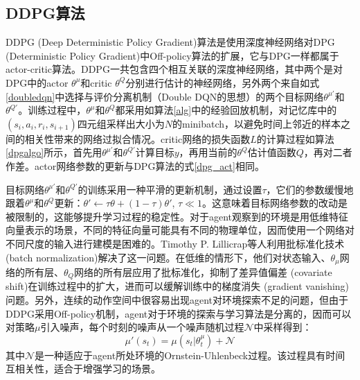 \subsection{DDPG算法}
DDPG (Deep Deterministic Policy Gradient)\cite{timothy2016cont}算法是使用深度神经网络对DPG (Deterministic Policy Gradient)\cite{silver2014deter}中Off-policy算法的扩展，它与DPG一样都属于actor-critic算法。DDPG一共包含四个相互关联的深度神经网络，其中两个是对DPG中的actor $\theta^\mu$和critic $\theta^Q$分别进行估计的神经网络，另外两个来自如式\ref{doubledqn}中选择与评价分离机制（Double DQN的思想）的两个目标网络$\theta^{\mu'}$和$\theta^{Q'}$。训练过程中，$\theta^\mu$和$\theta^Q$都采用如算法\ref{alg}中的经验回放机制，对记忆库中的$(s_i,a_i,r_i,s_{i+1})$四元组采样出大小为$N$的minibatch，以避免时间上邻近的样本之间的相关性带来的网络过拟合情况。critic网络的损失函数$L$的计算过程如算法\ref{dpgalgo}所示，首先用$\theta^{\mu'}$和$\theta^{Q'}$计算目标$y$，再用当前的$\theta^{Q}$估计值函数$Q$，再对二者作差。actor网络参数的更新与DPG算法的式\ref{dpg_act}相同。

目标网络$\theta^{\mu'}$和$\theta^{Q'}$的训练采用一种平滑的更新机制，通过设置$\tau$，它们的参数缓慢地跟着$\theta^{\mu}$和$\theta^{Q}$更新：$\theta' \leftarrow \tau\theta + (1 - \tau) \theta'$, $\tau \ll 1$。这意味着目标网络参数的改动是被限制的，这能够提升学习过程的稳定性\cite{timothy2016cont}。对于agent观察到的环境是用低维特征向量表示的场景，不同的特征向量可能具有不同的物理单位，因而使用一个网络对不同尺度的输入进行建模是困难的。Timothy P. Lillicrap等人利用批标准化技术 (batch normalization\cite{ioffe2015batch})解决了这一问题。在低维的情形下，他们对状态输入、$\theta_\mu$网络的所有层、$\theta_Q$网络的所有层应用了批标准化，抑制了差异值偏差 (covariate shift)在训练过程中的扩大，进而可以缓解训练中的梯度消失 (gradient vanishing)问题。另外，连续的动作空间中很容易出现agent对环境探索不足的问题，但由于DDPG采用Off-policy机制，agent对于环境的探索与学习算法是分离的，因而可以对策略$\mu$引入噪声，每个时刻的噪声从一个噪声随机过程$\mathcal{N}$中采样得到：
\begin{equation}
  \mu'(s_t) = \mu(s_t | \theta^\mu_t) + \mathcal{N}
\end{equation}
其中$\mathcal{N}$是一种适应于agent所处环境的Ornstein-Uhlenbeck过程\cite{uhlenbeck1930on}。该过程具有时间互相关性，适合于增强学习的场景。



